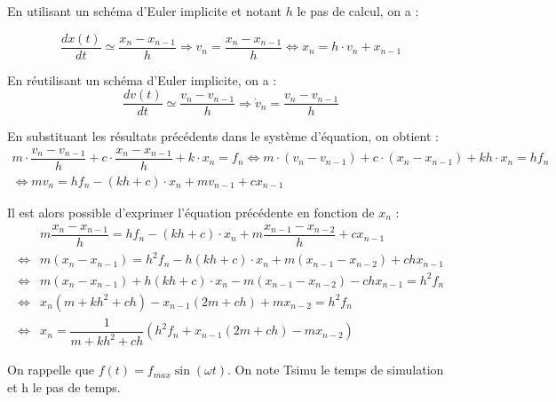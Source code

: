 \documentclass[10pt]{article}
\newif\ifprof
\begin{document}
En utilisant un schéma d'Euler implicite et notant $h$ le pas de calcul, on a : 

$$\dfrac{dx(t)}{dt} \simeq \dfrac{x_{n}-x_ {n-1}}{h}
\Longrightarrow
v_n = \dfrac{x_{n}-x_{n-1}}{h} \Longleftrightarrow x_{n} = h\cdot v_n + x_{n-1}$$

En réutilisant un schéma d'Euler implicite, on a :
$$\dfrac{dv(t)}{dt} \simeq \dfrac{v_{n}-v_ {n-1}}{h}
\Longrightarrow
\dot{v}_n = \dfrac{v_{n}-v_{n-1}}{h} $$

En substituant les résultats précédents dans le système d'équation, on obtient :
$$
\begin{array}{c}
m\cdot \dfrac{v_{n}-v_{n-1}}{h} +c\cdot \dfrac{x_{n}-x_{n-1}}{h} + k\cdot x_n = f_n
\Longleftrightarrow
m\cdot (v_{n}-v_{n-1}) +c\cdot (x_{n}-x_{n-1}) + kh\cdot x_n = hf_n  \\
\Longleftrightarrow mv_{n}  = hf_n -  (kh+c) \cdot x_n + mv_{n-1}+cx_{n-1} 
\end{array}
$$

Il est alors possible d'exprimer l'équation précédente en fonction de $x_n$ :
%
%
%
%
$$
\begin{array}{cl}
&m\dfrac{x_{n}-x_{n-1}}{h}  = hf_n -  (kh+c) \cdot x_n + m\dfrac{x_{n-1}-x_{n-2}}{h}+cx_{n-1} \\
\Longleftrightarrow& 
m(x_{n}-x_{n-1}) = h^2f_n -  h(kh+c) \cdot x_n + m(x_{n-1}-x_{n-2})+chx_{n-1} \\
\Longleftrightarrow& 
m(x_{n}-x_{n-1}) +  h(kh+c) \cdot x_n - m(x_{n-1}-x_{n-2})-chx_{n-1} = h^2f_n \\
\Longleftrightarrow &
x_{n}\left(m +kh^2+ch\right)-x_{n-1}(2m+ch) +mx_{n-2} = h^2f_n  \\
\Longleftrightarrow &
x_{n}= \dfrac{1}{m +kh^2+ch} \left(h^2f_n +x_{n-1}(2m+ch) -mx_{n-2} \right)
\end{array}
$$


\ifprof
\else

\vspace{.5cm}

On rappelle que $f(t)=f_{max} \sin \left(\omega t\right)$. On note \textsf{Tsimu} le temps de simulation et \textsf{h} le pas de temps. 
\end{document}
